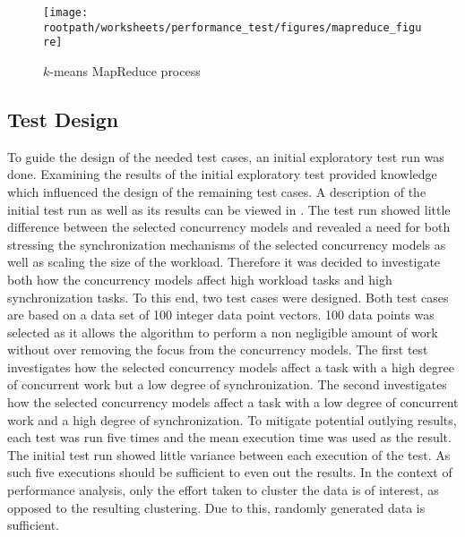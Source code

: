 \begin{figure}
\centering
\texttt{[image: \\rootpath/worksheets/performance\_test/figures/mapreduce\_figure]}
\caption{$k$-means MapReduce process}\label{fig:kmeans_mapreduce}
\end{figure}



\subsection{Test Design}
To guide the design of the needed test cases, an initial exploratory test run was done. Examining the results of the initial exploratory test provided knowledge which influenced the design of the remaining test cases. A description of the initial test run as well as its results can be viewed in . The test run showed little difference between the selected concurrency models and revealed a need for both stressing the synchronization mechanisms of the selected concurrency models as well as scaling the size of the workload. Therefore it was decided to investigate both how the concurrency models affect high workload tasks and high synchronization tasks. To this end, two test cases were designed. Both test cases are based on a data set of 100 integer data point vectors. 100 data points was selected as it allows the algorithm to perform a non negligible amount of work without over removing the focus from the concurrency models. The first test investigates how the selected concurrency models affect a task with a high degree of concurrent work but a low degree of synchronization. The second investigates how the selected concurrency models affect a task with a low degree of concurrent work and a high degree of synchronization. To mitigate potential outlying results, each test was run five times and the mean execution time was used as the result. The initial test run showed little variance between each execution of the test. As such five executions should be sufficient to even out the results. In the context of performance analysis, only the effort taken to cluster the data is of interest, as opposed to the resulting clustering. Due to this, randomly generated data is sufficient.


